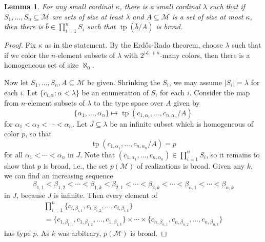 \documentclass{amsart}
\newtheorem{lemma}[theorem]{Lemma}
\theoremstyle{definition}
\newcommand{\tp}{\operatorname{tp}}
\begin{document}
\begin{lemma} \label{wj-erdos-rado}
  For any small cardinal $\kappa$, there is a small cardinal $\lambda$
  such that if $S_1,\ldots,S_n \subseteq \mathcal{M}$ are sets of size at least $\lambda$ and $A \subseteq \mathcal{M}$ is a  set of size at most $\kappa$, then
  there is $\bar{b} \in \prod_{i=1}^n S_i$ such that $\tp(\bar{b}/A)$ is
  broad.
\end{lemma}
\begin{proof}
  Fix $\kappa$ as in the statement. By the Erd\H{o}s-Rado theorem, choose $\lambda$ such that if
  we color the $n$-element subsets of $\lambda$ with
  $2^{|\mathcal{L}|+\kappa}$-many colors, then there is a homogeneous set of
  size $\aleph_0$.

  Now let $S_1,\ldots,S_n, A \subseteq \mathcal{M}$ be given.  Shrinking the
  $S_i$, we may assume $|S_i| = \lambda$ for each $i$.  Let
  $\{c_{i,\alpha} : \alpha < \lambda\}$ be an enumeration of $S_i$ for
  each $i$.  Consider the map from $n$-element subsets of $\lambda$
  to the type space over $A$ given by
  \begin{equation*}
    \{\alpha_1,\ldots,\alpha_n\} \mapsto \tp(c_{1,\alpha_1},\ldots,c_{n,\alpha_n}/A)
  \end{equation*}
  for $\alpha_1 < \alpha_2 < \cdots < \alpha_n$.  Let $J \subseteq
  \lambda$ be an infinite subset which is homogeneous of color $p$, so
  that
  \begin{equation*}
    \tp(c_{1,\alpha_1},\ldots,c_{n,\alpha_n}/A) = p
  \end{equation*}
  for all $\alpha_1 < \cdots < \alpha_n$ in $J$.  Note that
  $(c_{1,\alpha_1},\ldots,c_{n,\alpha_n}) \in \prod_{i=1}^n S_i$, so
  it remains to show that $p$ is broad, i.e., the set $p(\mathcal{M})$ of
  realizations is broad.  Given any $k$, we can find an increasing
  sequence
  \begin{equation*}
    \beta_{1,1} < \beta_{1,2} < \cdots < \beta_{1,k} < \beta_{2,1} < \cdots < \beta_{2,k} < \cdots < \beta_{n,1} < \cdots < \beta_{n,k}
  \end{equation*}
  in $J$, because $J$ is infinite.  Then every element of
  \begin{gather*}
    \prod_{i=1}^n \{c_{i,\beta_{i,1}},c_{i,\beta_{i,2}},\ldots,c_{i,\beta_{i,k}}\} \\
    = \{c_{1,\beta_{1,1}},c_{1,\beta_{1,2}},\ldots,c_{1,\beta_{1,k}}\} \times
    \cdots
    \times \{c_{n,\beta_{n,1}},c_{n,\beta_{n,2}},\ldots,c_{n,\beta_{n,k}}\}
  \end{gather*}
  has type $p$.  As $k$ was arbitrary, $p(\mathcal{M})$ is broad.
\end{proof}
\end{document}
